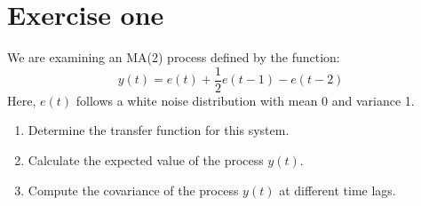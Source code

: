 \section{Exercise one}

We are examining an MA(2) process defined by the function:
\[y(t)=e(t)+\dfrac{1}{2}e(t-1)-e(t-2)\]
Here, $e(t)$ follows a white noise distribution with mean 0 and variance 1.
\begin{enumerate}
    \item Determine the transfer function for this system.
    \item Calculate the expected value of the process $y(t)$. 
    \item Compute the covariance of the process $y(t)$ at different time lags.
\end{enumerate}

